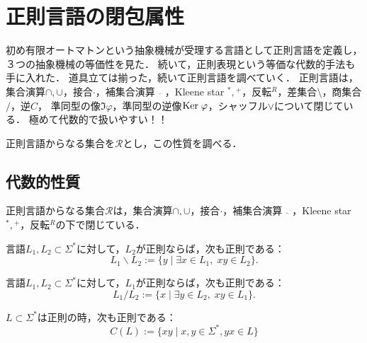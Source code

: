 \documentclass[uplatex, dvipdfmx]{jsreport}
\begin{document}
\section{正則言語の閉包属性}\label{sec-closure-properties-of-regular-languages}

\begin{tcolorbox}[colframe=ForestGreen, colback=ForestGreen!10!white, breakable]
    初め有限オートマトンという抽象機械が受理する言語として正則言語を定義し，３つの抽象機械の等価性を見た．
    続いて，正則表現という等価な代数的手法も手に入れた．
    道具立ては揃った，続いて正則言語を調べていく．
    正則言語は，集合演算$\cap,\cup$，接合$\cdot$，補集合演算$\overline{\quad}$，Kleene star ${}^*,{}^+$，反転${}^R$，差集合$\setminus$，商集合$/$，逆$C$，
    準同型の像$\Im\varphi$，準同型の逆像$\mathrm{Ker}\;\varphi$，シャッフル$\lor$について閉じている．
    極めて代数的で扱いやすい！！
\end{tcolorbox}

\begin{notation}
    正則言語からなる集合を$\mathcal{R}$とし，この性質を調べる．
\end{notation}

\subsection{代数的性質}

\begin{theorem}[代数的性質]\label{thm-closure-properties-of-regular-language}
    正則言語からなる集合$\mathcal{R}$は，集合演算$\cap,\cup$，接合$\cdot$，補集合演算$\overline{\quad}$，Kleene star ${}^*,{}^+$，反転${}^R$の下で閉じている．
\end{theorem}

\begin{theorem}[差集合]
    言語$L_1,L_2\subset\Sigma^*$に対して，$L_2$が正則ならば，次も正則である：
    \[ L_1\backslash L_2:=\{y\mid\exists x\in L_1,\;xy\in L_2\}. \]
\end{theorem}

\begin{theorem}[商集合]
    言語$L_1,L_2\subset\Sigma^*$に対して，$L_1$が正則ならば，次も正則である：
    \[ L_1/ L_2:=\{x\mid\exists y\in L_2,\;xy\in L_1\}. \]
\end{theorem}

\begin{theorem}
    $L\subset\Sigma^*$は正則の時，次も正則である：
    \[ C(L):=\{xy\mid x,y\in\Sigma^*,yx\in L\} \]
\end{theorem}
\end{document}
